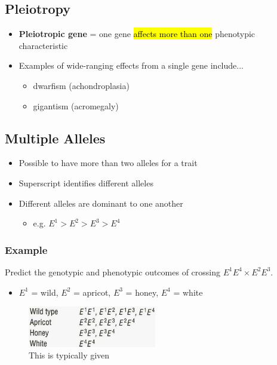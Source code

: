 \documentclass[a4paper,12pt]{article}
\begin{document}
\subsection{Pleiotropy}
\begin{itemize}
    \item{\textbf{Pleiotropic gene} = one gene \hl{affects more than one} phenotypic characteristic}
    \item{
            Examples of wide-ranging effects from a single gene include...
            \begin{itemize}
                \item{dwarfism (achondroplasia)}
                \item{gigantism (acromegaly)}
\end{itemize}
        }
\end{itemize}

\subsection{Multiple Alleles}
\begin{itemize}
    \item{Possible to have more than two alleles for a trait}
    \item{Superscript identifies different alleles}
    \item{
            Different alleles are dominant to one another
            \begin{itemize}
                \item{e.g. $E^1 > E^2 > E^3 > E^4$}
            \end{itemize}
        }
\end{itemize}

\subsubsection{Example}
Predict the genotypic and phenotypic outcomes of crossing $E^1E^4 \times E^2E^3$.

\begin{itemize}
    \item{$E^1$ = wild, $E^2$ = apricot, $E^3$ = honey, $E^4$ = white}
\end{itemize}

\begin{figure}[H]
    \centering
    \includegraphics[width=0.50\textwidth]{ex1a}
    \caption{This is typically given}
\end{figure}
\end{document}

